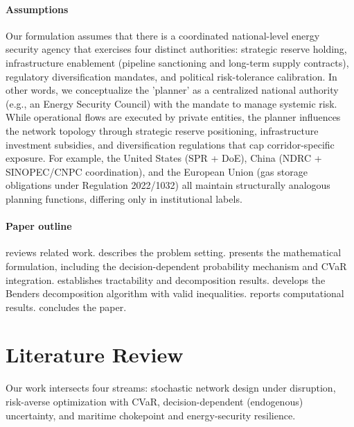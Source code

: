 \documentclass[final,3p,authoryear]{elsarticle}
\theoremstyle{definition}
\begin{document}
\paragraph{Assumptions}
Our formulation assumes that there is a coordinated national-level energy security agency that exercises four distinct authorities: strategic
reserve holding, infrastructure enablement (pipeline sanctioning
and long-term supply contracts), regulatory diversification
mandates, and political risk-tolerance calibration.  
In other words, we conceptualize the 'planner' as a centralized national authority (e.g., an Energy Security Council) with the mandate to manage systemic risk. While operational flows are executed by private entities, the planner influences the network topology through strategic reserve positioning, infrastructure investment subsidies, and diversification regulations that cap corridor-specific exposure.
For example, the United States (SPR + DoE), China (NDRC + SINOPEC/CNPC coordination), and
the European Union (gas storage obligations under Regulation
2022/1032) all maintain structurally analogous planning functions, differing only in institutional labels.
 
\paragraph{Paper outline}
 reviews related work.  describes
the problem setting.  presents the mathematical
formulation, including the decision-dependent probability mechanism and
CVaR integration.  establishes tractability and
decomposition results.
 develops the Benders decomposition algorithm with
valid inequalities.  reports computational results.
 concludes the paper. 


\section{Literature Review}
\label{sec:literature}

Our work intersects four streams: stochastic network design under
disruption, risk-averse optimization with CVaR, decision-dependent
(endogenous) uncertainty, and maritime chokepoint and energy-security
resilience.
\end{document}
